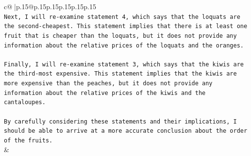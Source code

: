 \documentclass{article}
\begin{document}
{\begin{supertabular}{c@{$\;$}|p{.15\linewidth}@{}p{.15\linewidth}p{.15\linewidth}p{.15\linewidth}p{.15\linewidth}p{.15\linewidth}}
{{{\\ 
\texttt{Next, I will re{-}examine statement 4, which says that the loquats are the second{-}cheapest. This statement implies that there is at least one fruit that is cheaper than the loquats, but it does not provide any information about the relative prices of the loquats and the oranges.} \\
\\ 
\texttt{Finally, I will re{-}examine statement 3, which says that the kiwis are the third{-}most expensive. This statement implies that the kiwis are more expensive than the peaches, but it does not provide any information about the relative prices of the kiwis and the cantaloupes.} \\
\\ 
\texttt{By carefully considering these statements and their implications, I should be able to arrive at a more accurate conclusion about the order of the fruits.} \\
            }
        }
    }
    & \\ \\

\end{supertabular}
}
\end{document}
